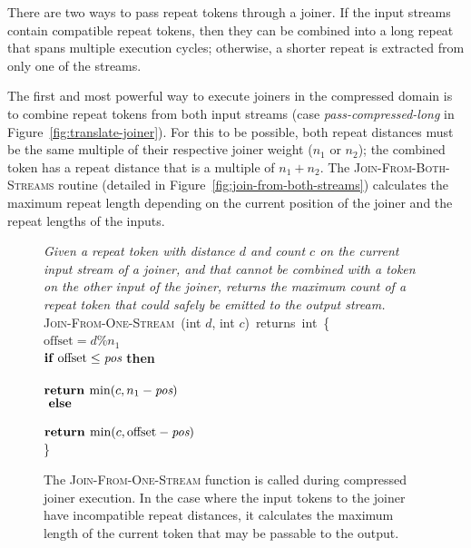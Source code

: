 There are two ways to pass repeat tokens through a joiner.  If the
input streams contain compatible repeat tokens, then they can be
combined into a long repeat that spans multiple execution cycles;
otherwise, a shorter repeat is extracted from only one of the streams.

The first and most powerful way to execute joiners in the compressed
domain is to combine repeat tokens from both input streams (case {\it
  pass-compressed-long} in Figure~\ref{fig:translate-joiner}).  For this to
be possible, both repeat distances must be the same multiple of their
respective joiner weight ($n_1$ or $n_2$); the combined token has a
repeat distance that is a multiple of $n_1 + n_2$.  The
\textsc{Join-From-Both-Streams} routine (detailed in
Figure~\ref{fig:join-from-both-streams}) calculates the maximum repeat length
depending on the current position of the joiner and the repeat lengths
of the inputs.

\begin{figure}[t!]
\centering
\begin{minipage}{0.75\textwidth}
{\it Given a repeat token with distance $d$ and count $c$ on the
  current input stream of a joiner, and that cannot be combined with a
  token on the other input of the joiner, returns the maximum count of
  a repeat token that could safely be emitted to the output stream.}\\
\textsc{Join-From-One-Stream}~(int $d$, int $c$)~returns~int~\{\\  $\mbox{offset} =
d$\%$n_1$\\ \tab$\mbox{{\bf if~}} \mbox{offset} \leq \mbox{\it pos}$ {\bf then}\\
\tab{}\\ \tab\tab$\mbox{\bf return~} \mbox{min}(c, n_1 - \mbox{\it pos})$\\ \tab$\mbox{\bf
  ~else}$\\ \tab{}\\ \tab\tab$\mbox{\bf return~} \mbox{min}(c, \mbox{offset} - \mbox{\it pos})$\\
\}
\end{minipage}
\caption[\textsc{Join-From-One-Stream} function for compressed joiner
  execution]{The \textsc{Join-From-One-Stream} function is called during
  compressed joiner execution.  In the case where the input tokens to
  the joiner have incompatible repeat distances, it calculates the
  maximum length of the current token that may be passable to the
  output. \protect\label{fig:join-from-one-stream}}
\end{figure}

